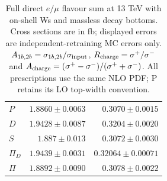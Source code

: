 \begin{table}[htbp]
\begin{tabular}{lrr}
$P$ & $1.8860\pm0.0063$ & $0.3070\pm0.0015$ \\
$D$ & $1.9428\pm0.0087$ & $0.3204\pm0.0020$ \\
$S$ & $1.887\pm0.013$ & $0.3072\pm0.0030$ \\
$\Pi_D$ & $1.9439\pm0.0031$ & $0.32064\pm0.00071$ \\
$\Pi$ & $1.8892\pm0.0090$ & $0.3078\pm0.0022$ \\
\bottomrule
\end{tabular}
\caption{Full direct $e/\mu$ flavour sum at 13 TeV with on-shell Ws and massless decay bottoms. Cross sections are in fb; displayed errors are independent-retraining MC errors only. $A_{1b,2b}=\sigma_{1b,2b}/\sigma_{\rm input}$, $R_{\rm charge}=\sigma^+/\sigma^-$ and $A_{\rm charge}=(\sigma^+-\sigma^-)/(\sigma^++\sigma^-)$. All prescriptions use the same NLO PDF; P retains its LO top-width convention.}
\label{tab:mainrates}
\end{table}

